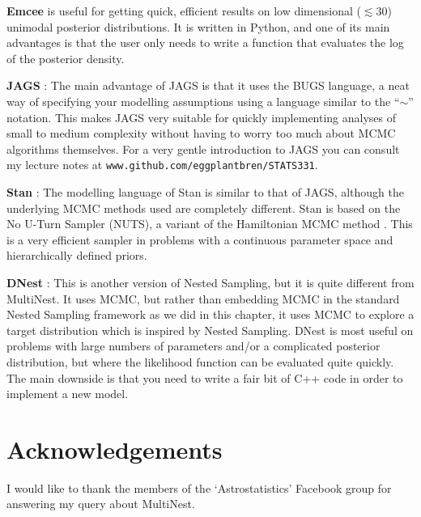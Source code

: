 {\bf Emcee} \citep{emcee} is useful for getting quick, efficient results on low
dimensional ($\lesssim 30$) unimodal posterior distributions.
It is written in Python, and one of its main advantages is that the user only
needs to write a function that evaluates the log of the posterior density.

{\bf JAGS} \citep{jags}: The main advantage of JAGS is that it
uses the BUGS language, a neat way of specifying your modelling assumptions
using a language similar to the ``$\sim$'' notation. This makes JAGS very
suitable for quickly implementing analyses of small to medium complexity without
having to worry too much about MCMC algorithms themselves. For a very gentle
introduction to JAGS you can consult my lecture notes at
{\tt www.github.com/eggplantbren/STATS331}.

{\bf Stan} \citep{stan}: The modelling language of Stan is similar to that of
JAGS, although the underlying MCMC methods used are completely different. Stan
is based on the No U-Turn Sampler (NUTS), a variant of the Hamiltonian MCMC
method \citep{hamiltonian}. This is a very efficient sampler in problems with
a continuous parameter space and hierarchically defined priors.

{\bf DNest} \citep{dnest}: This is another version of Nested Sampling, but it
is quite different from MultiNest. It uses MCMC, but rather than embedding
MCMC in the standard Nested Sampling framework as we did in this chapter, it
uses MCMC to explore a target distribution which is inspired by Nested Sampling.
DNest is most useful on problems with large numbers of parameters and/or a
complicated posterior distribution, but where the
likelihood function can be evaluated quite quickly. The main downside is that
you need to write a fair bit of C++ code in order to implement a new model.

\section{Acknowledgements}
I would like to thank the members of the `Astrostatistics' Facebook group for
answering my query about MultiNest.

